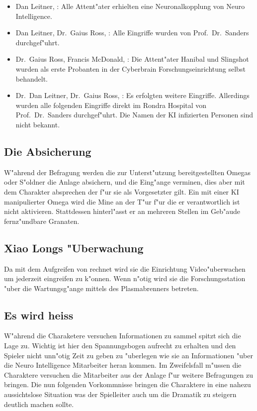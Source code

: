 \begin{itemize}
	\item Dan Leitner, \ml{}: Alle Attent"ater erhielten eine Neuronalkopplung von Neuro Intelligence.
	\item Dan Leitner, Dr.~Gaius Ross, \ml{}: Alle Eingriffe wurden von Prof.~Dr.~Sanders durchgef"uhrt.
	\item Dr.~Gaius Ross, Francis McDonald, \ml{}: Die Attent"ater Hanibal und Slingshot wurden als erste Probanten in der Cyberbrain 			Forschungseinrichtung selbst behandelt.	
	\item Dr.~Dan Leitner, Dr.~Gaius Ross, \ml{}: Es erfolgten weitere Eingriffe. Allerdings wurden alle folgenden Eingriffe direkt im 			Rondra Hospital von Prof.~Dr.~Sanders durchgef"uhrt. Die Namen der KI infizierten Personen sind nicht bekannt.
\end{itemize}

\subsection{Die Absicherung} 
W"ahrend der Befragung werden die zur Unterst"utzung bereitgestellten Omegas oder S"oldner die Anlage absichern, und die Eing"ange verminen, dies aber mit dem Charakter absprechen der f"ur sie als Vorgesetzter gilt. Ein mit einer KI manipulierter Omega wird die Mine an der T"ur f"ur die er verantwortlich ist nicht aktivieren. Stattdessen hinterl"asst er an mehreren Stellen im Geb"aude fernz"undbare Granaten.

\subsection{Xiao Longs "Uberwachung}  
Da \xl{} mit dem Aufgreifen von \ml{} rechnet wird sie die Einrichtung Video"uberwachen um jederzeit eingreifen zu k"onnen. Wenn n"otig wird sie die Forschungsstation "uber die Wartungsg"ange mittels des Plasmabrenners betreten.

\subsection{Es wird heiss} 
W"ahrend die Charaketere versuchen Informationen zu sammel spitzt sich die Lage zu. Wichtig ist hier den Spannungsbogen aufrecht zu erhalten und den Spieler nicht unn"otig Zeit zu geben zu "uberlegen wie sie an Informationen "uber die Neuro Intelligence Mitarbeiter heran kommen. Im Zweifelsfall m"ussen die Charaktere versuchen die Mitarbeiter aus der Anlage f"ur weitere Befragungen zu bringen. Die nun folgenden Vorkommnisse bringen die Charaktere in eine nahezu aussichtslose Situation was der Spielleiter auch um die Dramatik zu steigern deutlich machen sollte.

